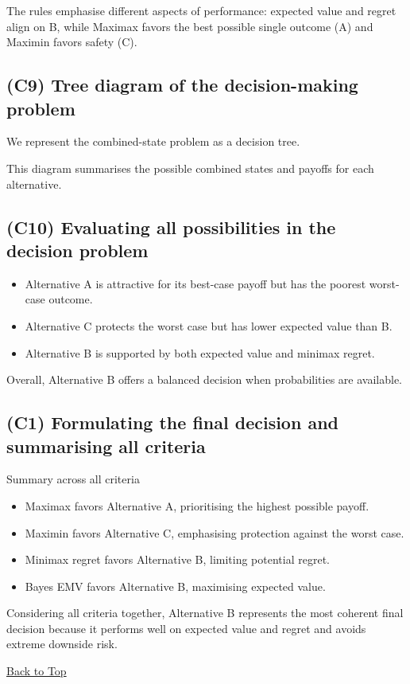 The rules emphasise different aspects of performance: expected value and regret align on B, while Maximax favors the best possible single outcome (A) and Maximin favors safety (C).

\subsection{(C9) Tree diagram of the decision-making problem}\label{subsubsec:example2-1-c9}

We represent the combined-state problem as a decision tree.

This diagram summarises the possible combined states and payoffs for each alternative.

\subsection{(C10) Evaluating all possibilities in the decision problem}\label{subsubsec:example2-1-c10}

\begin{itemize}
	\item Alternative A is attractive for its best-case payoff but has the poorest worst-case outcome.
	\item Alternative C protects the worst case but has lower expected value than B.
	\item Alternative B is supported by both expected value and minimax regret.
\end{itemize}

Overall, Alternative B offers a balanced decision when probabilities are available.

\subsection{(C1) Formulating the final decision and summarising all criteria}\label{subsubsec:example2-1-c1}

Summary across all criteria

\begin{itemize}
	\item Maximax favors Alternative A, prioritising the highest possible payoff.
	\item Maximin favors Alternative C, emphasising protection against the worst case.
	\item Minimax regret favors Alternative B, limiting potential regret.
	\item Bayes EMV favors Alternative B, maximising expected value.
\end{itemize}

Considering all criteria together, Alternative B represents the most coherent final decision because it performs well on expected value and regret and avoids extreme downside risk.

\vspace{6pt}
\noindent\hyperref[table-of-contents]{Back to Top}

